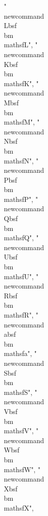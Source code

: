 {"\\newcommand{\\Lbsf}{\\bm{\\mathsf{L}}}",
"\\newcommand{\\Kbsf}{\\bm{\\mathsf{K}}}",
"\\newcommand{\\Mbsf}{\\bm{\\mathsf{M}}}",
"\\newcommand{\\Nbsf}{\\bm{\\mathsf{N}}}",
"\\newcommand{\\Pbsf}{\\bm{\\mathsf{P}}}",
"\\newcommand{\\Qbsf}{\\bm{\\mathsf{Q}}}",
"\\newcommand{\\Ubsf}{\\bm{\\mathsf{U}}}",
"\\newcommand{\\Rbsf}{\\bm{\\mathsf{R}}}",
"\\newcommand{\\absf}{\\bm{\\mathsf{a}}}",
"\\newcommand{\\Sbsf}{\\bm{\\mathsf{S}}}",
"\\newcommand{\\Vbsf}{\\bm{\\mathsf{V}}}",
"\\newcommand{\\Wbsf}{\\bm{\\mathsf{W}}}",
"\\newcommand{\\Xbsf}{\\bm{\\mathsf{X}}}",
}
